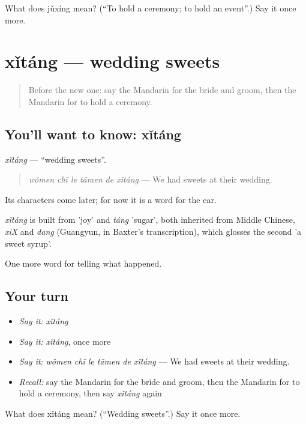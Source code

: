 \begin{tcolorbox}[breakable,colback=teal!4,colframe=teal!35!black,title={Before you move on}]
What does jǔxíng mean? (\textquotedblleft{}To hold a ceremony; to hold an event\textquotedblright{}.) Say it once more.
\end{tcolorbox}
\section[xǐtáng]{xǐtáng — wedding sweets}

\label{lesson:ZH-C306-xitang}



\begin{quote}
Before the new one: say the Mandarin for the bride and groom, then the Mandarin for to hold a ceremony.
\end{quote}

\subsection*{You'll want to know: xǐtáng}
\emph{xǐtáng} — \textquotedblleft{}wedding sweets\textquotedblright{}.

\begin{quote}
\emph{wǒmen chī le tāmen de xǐtáng} — We had sweets at their wedding.
\end{quote}

Its characters come later; for now it is a word for the ear.

\begin{cousinweb}
\emph{xǐtáng} is built from  'joy' and \emph{táng} 'sugar', both inherited from Middle Chinese, \emph{xiX} and \emph{dang} (Guangyun, in Baxter's transcription), which glosses the second 'a sweet syrup'.
\end{cousinweb}

\begin{grammarlens}[title={What you've built}]
One more word for telling what happened.
\end{grammarlens}

\subsection*{Your turn}
\begin{itemize}
\raggedright
  \item \emph{Say it:} \emph{xǐtáng}
  \item \emph{Say it:} \emph{xǐtáng}, once more
  \item \emph{Say it:} \emph{wǒmen chī le tāmen de xǐtáng} — We had sweets at their wedding.
  \item \emph{Recall:} say the Mandarin for the bride and groom, then the Mandarin for to hold a ceremony, then say \emph{xǐtáng} again
\end{itemize}

\begin{tcolorbox}[breakable,colback=teal!4,colframe=teal!35!black,title={Before you move on}]
What does xǐtáng mean? (\textquotedblleft{}Wedding sweets\textquotedblright{}.) Say it once more.
\end{tcolorbox}
